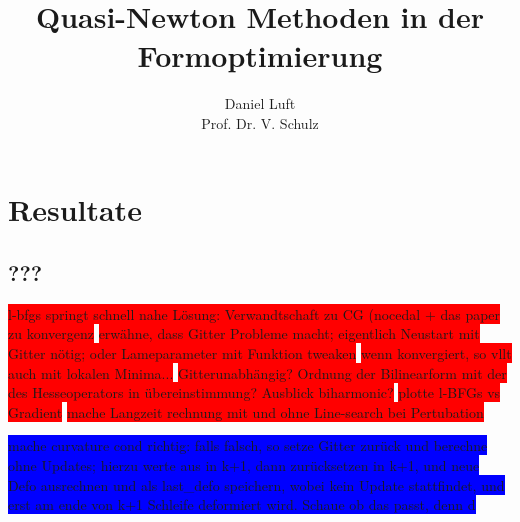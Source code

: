 \documentclass[bibliography=totoc,12pt,a4paper]{scrartcl}
\theoremstyle{exampstyle}
\numberwithin{equation}{section}
\begin{document}
\title{Quasi-Newton Methoden in der Formoptimierung}

\author{Daniel Luft \\ Prof. Dr. V. Schulz}

  \pagestyle{empty}

  \pagestyle{headings}
  

\section{Resultate}
\subsection{???}

\colorbox{red}{l-bfgs springt schnell nahe Lösung: Verwandtschaft zu CG (nocedal + das paper zu konvergenz}
\colorbox{red}{erwähne, dass Gitter Probleme macht; eigentlich Neustart mit Gitter nötig; oder Lameparameter mit Funktion tweaken}
\colorbox{red}{wenn konvergiert, so vllt auch mit lokalen Minima...}
\colorbox{red}{Gitterunabhängig? Ordnung der Bilinearform mit der des Hesseoperators in übereinstimmung? Ausblick biharmonic?}
\colorbox{red}{plotte l-BFGs vs Gradient}
\colorbox{red}{mache Langzeit rechnung mit und ohne Line-search bei Pertubation}

\colorbox{blue}{mache curvature cond richtig: falls falsch, so setze Gitter zurück und berechne ohne Updates; hierzu werte aus in k+1, dann zurücksetzen in k+1, und neue Defo ausrechnen und als last\_defo speichern, wobei kein Update stattfindet, und erst am ende von k+1 Schleife deformiert wird. Schaue ob das passt, denn d}

\newpage
\nocite{*}


\end{document}

